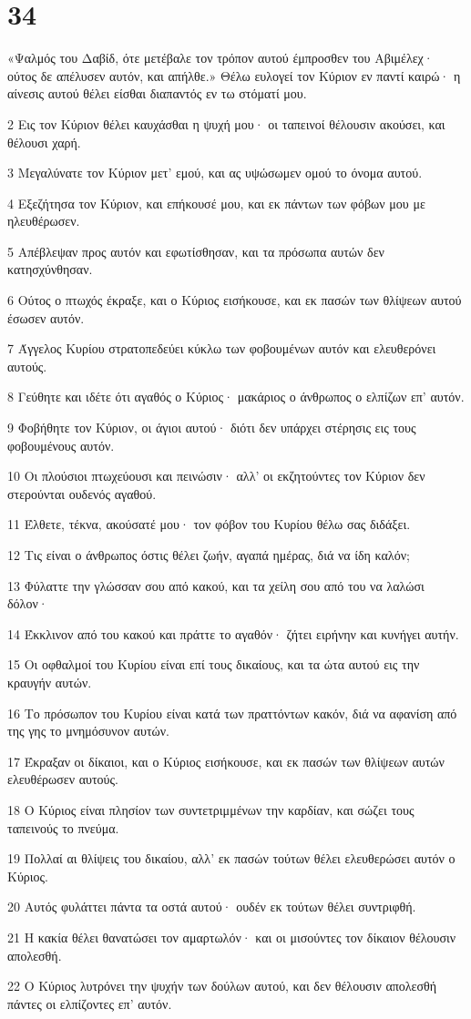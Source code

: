 \chapter{34}

\par «Ψαλμός του Δαβίδ, ότε μετέβαλε τον τρόπον αυτού έμπροσθεν του Αβιμέλεχ· ούτος δε απέλυσεν αυτόν, και απήλθε.» Θέλω ευλογεί τον Κύριον εν παντί καιρώ· η αίνεσις αυτού θέλει είσθαι διαπαντός εν τω στόματί μου.
\par 2 Εις τον Κύριον θέλει καυχάσθαι η ψυχή μου· οι ταπεινοί θέλουσιν ακούσει, και θέλουσι χαρή.
\par 3 Μεγαλύνατε τον Κύριον μετ' εμού, και ας υψώσωμεν ομού το όνομα αυτού.
\par 4 Εξεζήτησα τον Κύριον, και επήκουσέ μου, και εκ πάντων των φόβων μου με ηλευθέρωσεν.
\par 5 Απέβλεψαν προς αυτόν και εφωτίσθησαν, και τα πρόσωπα αυτών δεν κατησχύνθησαν.
\par 6 Ούτος ο πτωχός έκραξε, και ο Κύριος εισήκουσε, και εκ πασών των θλίψεων αυτού έσωσεν αυτόν.
\par 7 Άγγελος Κυρίου στρατοπεδεύει κύκλω των φοβουμένων αυτόν και ελευθερόνει αυτούς.
\par 8 Γεύθητε και ιδέτε ότι αγαθός ο Κύριος· μακάριος ο άνθρωπος ο ελπίζων επ' αυτόν.
\par 9 Φοβήθητε τον Κύριον, οι άγιοι αυτού· διότι δεν υπάρχει στέρησις εις τους φοβουμένους αυτόν.
\par 10 Οι πλούσιοι πτωχεύουσι και πεινώσιν· αλλ' οι εκζητούντες τον Κύριον δεν στερούνται ουδενός αγαθού.
\par 11 Έλθετε, τέκνα, ακούσατέ μου· τον φόβον του Κυρίου θέλω σας διδάξει.
\par 12 Τις είναι ο άνθρωπος όστις θέλει ζωήν, αγαπά ημέρας, διά να ίδη καλόν;
\par 13 Φύλαττε την γλώσσαν σου από κακού, και τα χείλη σου από του να λαλώσι δόλον·
\par 14 Έκκλινον από του κακού και πράττε το αγαθόν· ζήτει ειρήνην και κυνήγει αυτήν.
\par 15 Οι οφθαλμοί του Κυρίου είναι επί τους δικαίους, και τα ώτα αυτού εις την κραυγήν αυτών.
\par 16 Το πρόσωπον του Κυρίου είναι κατά των πραττόντων κακόν, διά να αφανίση από της γης το μνημόσυνον αυτών.
\par 17 Έκραξαν οι δίκαιοι, και ο Κύριος εισήκουσε, και εκ πασών των θλίψεων αυτών ελευθέρωσεν αυτούς.
\par 18 Ο Κύριος είναι πλησίον των συντετριμμένων την καρδίαν, και σώζει τους ταπεινούς το πνεύμα.
\par 19 Πολλαί αι θλίψεις του δικαίου, αλλ' εκ πασών τούτων θέλει ελευθερώσει αυτόν ο Κύριος.
\par 20 Αυτός φυλάττει πάντα τα οστά αυτού· ουδέν εκ τούτων θέλει συντριφθή.
\par 21 Η κακία θέλει θανατώσει τον αμαρτωλόν· και οι μισούντες τον δίκαιον θέλουσιν απολεσθή.
\par 22 Ο Κύριος λυτρόνει την ψυχήν των δούλων αυτού, και δεν θέλουσιν απολεσθή πάντες οι ελπίζοντες επ' αυτόν.

